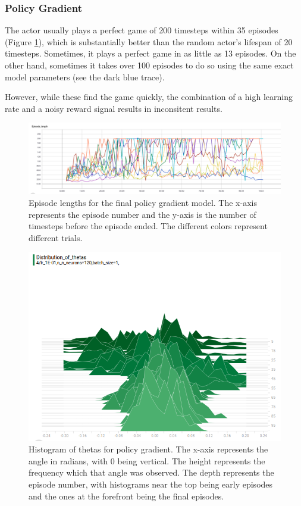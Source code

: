 \documentclass[12pt,a4paper]{article}
\begin{document}
\subsubsection*{Policy Gradient}

The actor usually plays a perfect game of 200 timesteps within 35 episodes (Figure \ref{pg_episodes}), which is substantially better than the random actor's lifespan of 20 timesteps. Sometimes, it plays a perfect game in as little as 13 episodes. On the other hand, sometimes it takes over 100 episodes to do so using the same exact model parameters (see the dark blue trace).

However, while these find the game quickly, the combination of a high learning rate and a noisy reward signal results in inconsitent results.

\begin{figure}[htbp]
\begin{center}
\includegraphics[width=\linewidth]{pg_episodes.png}
\caption{Episode lengths for the final policy gradient model.  The x-axis represents the episode number and the y-axis is the number of timesteps before the episode ended. The different colors represent different trials.  }
\label{pg_episodes}
\end{center}
\end{figure}

\begin{figure}[htbp]
\begin{center}
\includegraphics[width=\linewidth]{pg_thetas.png}
\caption{Histogram of thetas for policy gradient. The x-axis represents the angle in radians, with 0 being vertical. The height represents the frequency which that angle was observed. The depth represents the episode number, with histograms near the top being early episodes and the ones at the forefront being the final episodes.}
\label{pg_thetas}
\end{center}
\end{figure}
\end{document}
